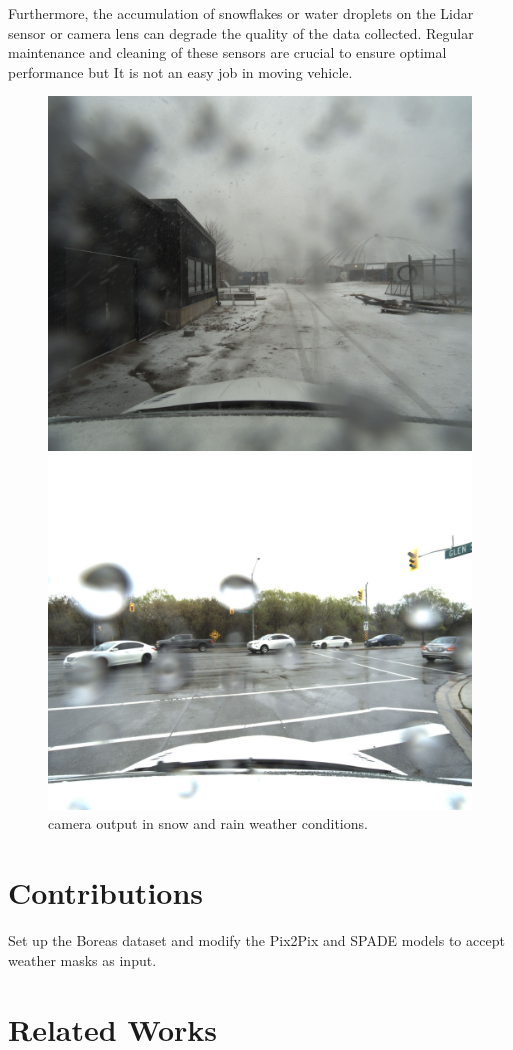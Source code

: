 Furthermore, the accumulation of snowflakes or water droplets on the Lidar sensor or camera lens can degrade the quality of the data collected. Regular maintenance and cleaning of these sensors are crucial to ensure optimal performance but It is not an easy job in  moving vehicle. 
\begin{figure}[!ht]
	\begin{minipage}[t]{.45\linewidth}
		
		
		\includegraphics[width=\linewidth]{imgs/1611676774731026.png}
	\end{minipage}\hfill
	\begin{minipage}[b]{.45\linewidth}
		\includegraphics[width=\linewidth]{imgs/1619726918389964.jpg}
		
	\end{minipage}
	\caption{camera output in snow and rain weather conditions.}
	
	\label{img:rickety-camera}
\end{figure}

\section{Contributions}
Set up the Boreas dataset and modify the Pix2Pix and SPADE models to accept weather masks as input.
\section{Related Works}